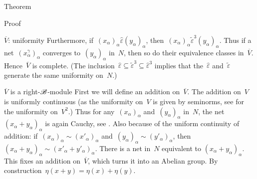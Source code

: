 \begin{parsec}
\begin{point}{Theorem}
\begin{point}{Proof}
\begin{point}{$\overline{V}$: uniformity}
Furthermore, if~$(x_\alpha)_\alpha \mathrel{\hat\varepsilon}
(y_\alpha)_\alpha $,
then~$(x_\alpha)_\alpha \mathrel{\tilde\varepsilon^3} (y_\alpha)_\alpha$.
Thus if a net~$(x^\gamma_\alpha)_\alpha$
converges to~$(y_\alpha)_\alpha$ in~$N$,
then so do their equivalence classes in~$\overline{V}$.
Hence~$\overline{V}$ is complete.
(The inclusion~$\hat\varepsilon \subseteq \tilde\varepsilon^3 \subseteq
        \hat\varepsilon^3$
        implies that the~$\hat\varepsilon$ and~$\tilde\varepsilon$
        generate the same uniformity on~$N$.)
\end{point}
\begin{point}{$\overline{V}$ is a right-$\mathscr{B}$-module}%
    First we will define an addition on~$\overline{V}$.
    The addition on~$V$ is uniformly continuous
    (as the uniformity on~$V$ is given by seminorms,
    see  for the uniformity on~$V^2$.)
    Thus for any~$(x_\alpha)_\alpha$
    and~$(y_\alpha)_\alpha$ in~$N$,
    the net~$(x_\alpha+y_\alpha)_\alpha$ is again Cauchy,
        see .
    Also because of the uniform continuity of addition:
    if~$(x_\alpha)_\alpha \sim (x'_\alpha)_\alpha$
    and~$(y_\alpha)_\alpha \sim (y'_\alpha)_\alpha$,
    then~$(x_\alpha+y_\alpha)_\alpha \sim
            (x'_\alpha+y'_\alpha)_\alpha$.
    There is a net in~$N$ equivalent to $(x_\alpha+y_\alpha)_\alpha$.
    This fixes an addition on~$\overline{V}$,
        which turns it into an Abelian group.
        By construction~$\eta(x+y) = \eta(x)+\eta(y)$.


\end{point}
\end{point}
\end{point}
\end{parsec}
